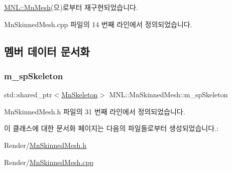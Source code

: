 \hyperlink{class_m_n_l_1_1_mn_mesh_a694b6dfe0ae3ed0f97bcf055525b8659}{M\+N\+L\+::\+Mn\+Mesh}(으)로부터 재구현되었습니다.



Mn\+Skinned\+Mesh.\+cpp 파일의 14 번째 라인에서 정의되었습니다.



\subsection{멤버 데이터 문서화}
\mbox{\label{class_m_n_l_1_1_mn_skinned_mesh_a38fb5a56e78aafdb535dfd3115857527}} 
\subsubsection{\texorpdfstring{m\+\_\+sp\+Skeleton}{m\_spSkeleton}}
{\footnotesize\ttfamily std\+::shared\+\_\+ptr$<$\hyperlink{class_m_n_l_1_1_mn_skeleton}{Mn\+Skeleton}$>$ M\+N\+L\+::\+Mn\+Skinned\+Mesh\+::m\+\_\+sp\+Skeleton\hspace{0.3cm}{\ttfamily [private]}}



Mn\+Skinned\+Mesh.\+h 파일의 31 번째 라인에서 정의되었습니다.



이 클래스에 대한 문서화 페이지는 다음의 파일들로부터 생성되었습니다.\+:\begin{DoxyCompactItemize}
\item 
Render/\hyperlink{_mn_skinned_mesh_8h}{Mn\+Skinned\+Mesh.\+h}\item 
Render/\hyperlink{_mn_skinned_mesh_8cpp}{Mn\+Skinned\+Mesh.\+cpp}\end{DoxyCompactItemize}
